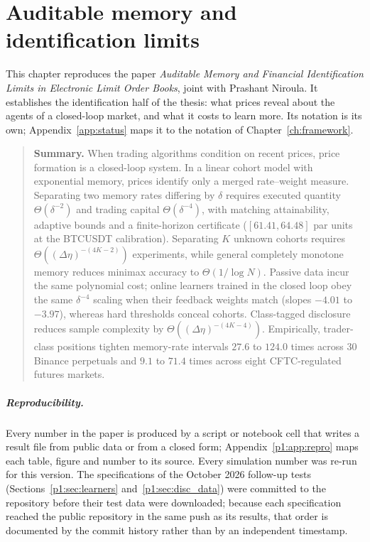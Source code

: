 \chapter{Auditable memory and identification limits}\label{ch:p1}

This chapter reproduces the paper \emph{Auditable Memory and Financial Identification Limits in Electronic Limit Order Books}, joint with Prashant Niroula. It establishes the identification half of the thesis: what prices reveal about the agents of a closed-loop market, and what it costs to learn more. Its notation is its own; Appendix~\ref{app:status} maps it to the notation of Chapter~\ref{ch:framework}.

\begin{quote}\small\textbf{Summary.} When trading algorithms condition on recent prices, price formation is a closed-loop system. In a linear cohort model with exponential memory, prices identify only a merged rate--weight measure. Separating two memory rates differing by $\delta$ requires executed quantity $\Theta(\delta^{-2})$ and trading capital $\Theta(\delta^{-4})$, with matching attainability, adaptive bounds and a finite-horizon certificate ($[61.41, 64.48]$ par units at the BTCUSDT calibration). Separating $K$ unknown cohorts requires $\Theta((\Delta\eta)^{-(4K-2)})$ experiments, while general completely monotone memory reduces minimax accuracy to $\Theta(1/\log N)$. Passive data incur the same polynomial cost; online learners trained in the closed loop obey the same $\delta^{-4}$ scaling when their feedback weights match (slopes $-4.01$ to $-3.97$), whereas hard thresholds conceal cohorts. Class-tagged disclosure reduces sample complexity by $\Theta((\Delta\eta)^{-(4K-4)})$. Empirically, trader-class positions tighten memory-rate intervals $27.6$ to $124.0$ times across 30 Binance perpetuals and $9.1$ to $71.4$ times across eight CFTC-regulated futures markets.\end{quote}

\paragraph{Reproducibility.}Every number in the paper is produced by a script or notebook cell that writes a result file from public data or from a closed form; Appendix~\ref{p1:app:repro} maps each table, figure and number to its source. Every simulation number was re-run for this version. The specifications of the October 2026 follow-up tests (Sections~\ref{p1:sec:learners} and~\ref{p1:sec:disc_data}) were committed to the repository before their test data were downloaded; because each specification reached the public repository in the same push as its results, that order is documented by the commit history rather than by an independent timestamp.


